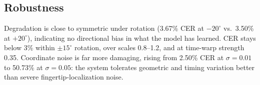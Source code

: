 \documentclass[runningheads]{llncs}
\begin{document}
\FloatBarrier
\subsection{Robustness}
\begin{table}[htbp]
\centering
\caption{Robustness of the selected $K=2$ checkpoint. Rotation (signed, degrees) is applied symmetrically about $0^\circ$ since a camera/wrist offset has no preferred direction; noise is normalized coordinate standard deviation; scale is multiplicative; time warp is the log-increment standard deviation.}
\label{tab:robustness}
\end{table}
Degradation is close to symmetric under rotation (3.67\% CER at $-20^\circ$ vs.\ 3.50\% at $+20^\circ$), indicating no directional bias in what the model has learned. CER stays below 3\% within $\pm15^\circ$ rotation, over scales 0.8--1.2, and at time-warp strength 0.35. Coordinate noise is far more damaging, rising from 2.50\% CER at $\sigma=0.01$ to 50.73\% at $\sigma=0.05$: the system tolerates geometric and timing variation better than severe fingertip-localization noise.
\end{document}
